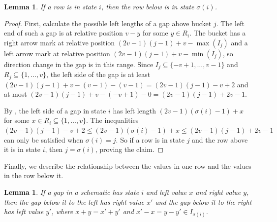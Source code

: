 \documentclass[11pt]{article}
\theoremstyle{plain}
\newtheorem{lemma}[theorem]{Lemma}
\theoremstyle{definition}
\begin{document}
\begin{lemma}\label{lem:statecycle}
If a row is in state $i$, then the row below is in state $\sigma(i)$. 
\end{lemma}

\begin{proof}
First, calculate the possible left lengths of a gap above bucket $j$. The left end of such a gap is at relative position $v-y$ for some $y\in R_i$.
The bucket has a right arrow mark at relative position $(2v-1)(j-1)+v-\max(I_j)$ and a left arrow mark at relative position $(2v-1)(j-1)+v-\min(I_j)$, so direction change in the gap is in this range. Since $I_j\subseteq \{-v+1, \dots, v-1\}$ and $R_j\subseteq \{1, \dots, v\}$, the left side of the gap is at least $(2v-1)(j-1)+v-(v-1)-(v-1)=(2v-1)(j-1)-v+2$ and at most $(2v-1)(j-1)+v-(-v+1)-0=(2v-1)(j-1)+2v-1$.

By , the left side of a gap in state $i$ has left length $(2v-1)(\sigma(i)-1)+x$ for some $x\in R_i\subseteq \{1, \dots, v\}$. The inequalities $(2v-1)(j-1)-v+2\le (2v-1)(\sigma(i)-1)+x \le (2v-1)(j-1)+2v-1$ can only be satisfied when $\sigma(i)=j$. So if a row is in state $j$ and the row above it is in state $i$, then $j=\sigma(i)$, proving the claim.
\end{proof}

Finally, we describe the relationship between the values in one row and the values in the row below it.

\begin{lemma}\label{lem:intervalbound}
If a gap in a schematic has state $i$ and left value $x$ and right value $y$, then the gap below it to the left has right value $x'$ and the gap below it to the right has left value $y'$, where $x+y=x'+y'$ and $x'-x=y-y'\in I_{\sigma(i)}$. 
\end{lemma}
\end{document}
